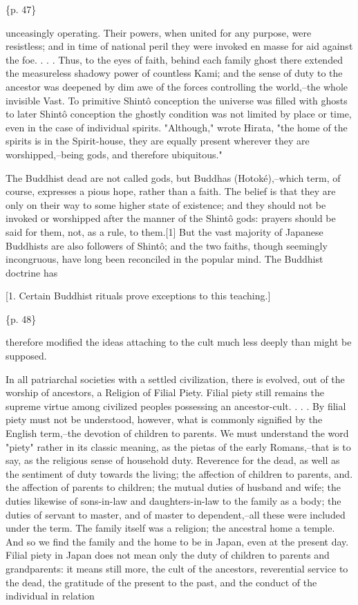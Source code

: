 \{p. 47\}

unceasingly operating. Their powers, when united for any purpose, were resistless; and in time of national peril they were invoked en masse for aid against the foe. . . . Thus, to the eyes of faith, behind each family ghost there extended the measureless shadowy power of countless Kami; and the sense of duty to the ancestor was deepened by dim awe of the forces controlling the world,--the whole invisible Vast. To primitive Shintô conception the universe was filled with ghosts to later Shintô conception the ghostly condition was not limited by place or time, even in the case of individual spirits. "Although," wrote Hirata, "the home of the spirits is in the Spirit-house, they are equally present wherever they are worshipped,--being gods, and therefore ubiquitous."



The Buddhist dead are not called gods, but Buddhas (Hotoké),--which term, of course, expresses a pious hope, rather than a faith. The belief is that they are only on their way to some higher state of existence; and they should not be invoked or worshipped after the manner of the Shintô gods: prayers should be said for them, not, as a rule, to them.[1] But the vast majority of Japanese Buddhists are also followers of Shintô; and the two faiths, though seemingly incongruous, have long been reconciled in the popular mind. The Buddhist doctrine has

[1. Certain Buddhist rituals prove exceptions to this teaching.]

\{p. 48\}

therefore modified the ideas attaching to the cult much less deeply than might be supposed.



In all patriarchal societies with a settled civilization, there is evolved, out of the worship of ancestors, a Religion of Filial Piety. Filial piety still remains the supreme virtue among civilized peoples possessing an ancestor-cult. . . . By filial piety must not be understood, however, what is commonly signified by the English term,--the devotion of children to parents. We must understand the word "piety" rather in its classic meaning, as the pietas of the early Romans,--that is to say, as the religious sense of household duty. Reverence for the dead, as well as the sentiment of duty towards the living; the affection of children to parents, and. the affection of parents to children; the mutual duties of husband and wife; the duties likewise of sons-in-law and daughters-in-law to the family as a body; the duties of servant to master, and of master to dependent,--all these were included under the term. The family itself was a religion; the ancestral home a temple. And so we find the family and the home to be in Japan, even at the present day. Filial piety in Japan does not mean only the duty of children to parents and grandparents: it means still more, the cult of the ancestors, reverential service to the dead, the gratitude of the present to the past, and the conduct of the individual in relation

